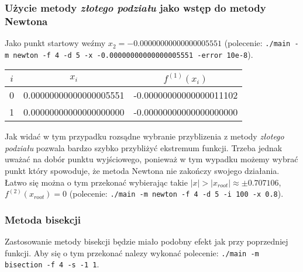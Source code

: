 \documentclass[a4paper,11pt]{article}
\begin{document}
  \subsubsection{Użycie metody \emph{złotego podziału} jako wstęp do metody Newtona}
  Jako punkt startowy weźmy $ x_2 = -0.00000000000000005551 $ (polecenie: \texttt{./main -m newton -f 4 -d 5 -x -0.00000000000000005551 -error 10e-8}).
  \begin{center}
      \begin{tabular}{S[table-format=1.0]S[table-format=-1.9]S[table-format=-1.15,table-auto-round=false]}
        \toprule
        {$i$}                & {$x_i$}               & {$f^{(1)}(x_i)$}            \\  & 0.00000000000000005551 & -0.00000000000000011102 \\
          1 & 0.00000000000000000000 & -0.00000000000000000000 \\ \bottomrule
        \end{tabular}
    \end{center}
      Jak widać w tym przypadku rozsądne wybranie przyblizenia z metody \emph{złotego podziału} pozwala bardzo szybko przybliżyć ekstremum funkcji. Trzeba jednak uważać na dobór punktu wyjściowego, ponieważ w tym wypadku możemy wybrać punkt który spowoduje, że metoda Newtona nie zakończy swojego działania. Łatwo się można o tym przekonać wybierając takie $ |x| > |x_{root}| \approx \pm 0.707106 $, $ f^{(2)}(x_{root}) = 0 $ (polecenie: \texttt{./main -m newton -f 4 -d 5 -i 100 -x 0.8}).
      
  \subsubsection{Metoda bisekcji}
  Zastosowanie metody bisekcji będzie miało podobny efekt jak przy poprzedniej funkcji. Aby się o tym przekonać nalezy wykonać polecenie: \texttt{./main -m bisection -f 4 -s -1 1}.
  
\end{document}
